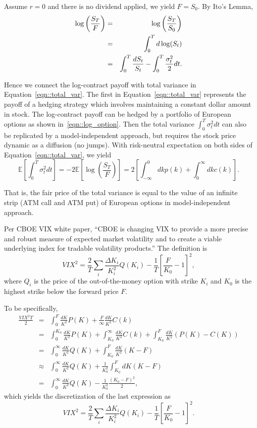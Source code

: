 \documentclass[11pt,reqno,final]{amsart}
\begin{document}
Assume $r=0$ and there is no dividend applied, we yield $F=S_0$. By Ito's Lemma,
\begin{eqnarray}
  \log\left(\frac{S_T}{F}\right) &=& \log\left(\frac{S_T}{S_0}\right) \notag \\
     &=& \int_0^T d \log(S_t) \notag \\
     &=& \int_0^T \frac{d S_t}{S_t} - \int_0^T \frac{\sigma_t^2}{2} dt. \label{eqn::total_var}
\end{eqnarray}

Hence we connect the log-contract payoff with total variance in Equation~\ref{eqn::total_var}. The first in Equation~\ref{eqn::total_var} represents the payoff of a hedging strategy which involves maintaining a constant dollar amount in stock. The log-contract payoff can be hedged by a portfolio of European options as shown in~\ref{eqn::log_option}. Then the total variance $\int_0^T \sigma_t^2 dt$ can also be replicated by a model-independent approach, but requires the stock price dynamic as a diffusion (no jumps). With risk-neutral expectation on both sides of Equation~\ref{eqn::total_var}, we yield
$$
\mathbb{E}\left[\int_0^T \sigma_t^2 dt \right] = -2\mathbb{E}\left[ \log\left(\frac{S_T}{F}\right)\right] = 2\left[\int_{-\infty}^0 dk p(k) + \int_{0}^{\infty} dk c(k) \right].
$$

That is, the fair price of the total variance is equal to the value of an infinite strip (ATM call and ATM put) of European options in model-independent approach.

Per CBOE VIX white paper, ``CBOE is changing VIX to provide a more precise and robust measure of expected market volatility and to create a viable underlying index for tradable volatility products.'' The definition is
\begin{equation}
VIX^2 = \frac{2}{T} \sum_i \frac{\Delta K_i}{K_i^2} Q(K_i) - \frac{1}{T} \left[\frac{F}{K_0} -1\right]^2, \label{eqn::vix_def}
\end{equation}
where $Q_i$ is the price of the out-of-the-money option with strike $K_i$ and $K_0$ is the highest strike below the forward price $F$.

To be specifically, 
\begin{eqnarray*}
  \frac{VIX^2 T}{2} &=& \int_0^F \frac{dK}{K^2}P(K) + \frac{F}{\infty} \frac{dK}{K^2}C(k) \\
   &=& \int_0^{K_0} \frac{dK}{K^2}P(K)+ \int_{K_0}^{\infty}\frac{dK}{K^2}C(k) +\int_{K_0}^F \frac{dK}{K^2} (P(K)-C(K))  \\
   &=& \int_0^{\infty} \frac{dK}{K^2} Q(K) + \int_{K_0}^{F} \frac{dK}{K^2} (K-F) \\
   &\approx&  \int_0^{\infty} \frac{dK}{K^2} Q(K) + \frac{1}{K_0^2} \int_{K_0}^F dK(K-F) \\
   &=& \int_0^{\infty} \frac{dK}{K^2} Q(K) - \frac{1}{K_0^2} \frac{(K_0-F)^2}{2},
\end{eqnarray*}
which yields the discretization of the last expression as 
$$
VIX^2 = \frac{2}{T} \sum_i \frac{\Delta K_i}{K_i^2} Q(K_i) - \frac{1}{T} \left[\frac{F}{K_0} -1\right]^2.
$$
\end{document}
